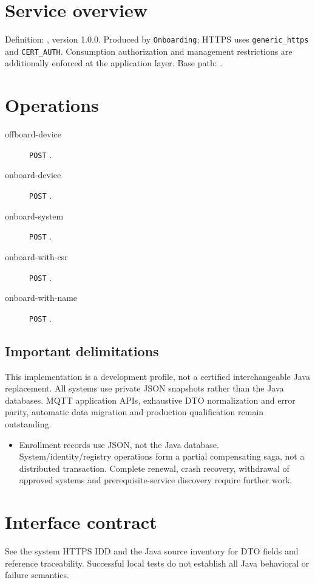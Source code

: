 \documentclass[a4paper]{arrowhead}
\begin{document}
\ArrowheadSetup
\section{Service overview}
Definition: , version 1.0.0. Produced by \texttt{Onboarding}; HTTPS uses \texttt{generic\_https} and \texttt{CERT\_AUTH}. Consumption authorization and management restrictions are additionally enforced at the application layer. Base path: .
\section{Operations}
\begin{description}
\item[offboard-device] \texttt{POST} .
\item[onboard-device] \texttt{POST} .
\item[onboard-system] \texttt{POST} .
\item[onboard-with-csr] \texttt{POST} .
\item[onboard-with-name] \texttt{POST} .
\end{description}
\subsection{Important delimitations}
This implementation is a development profile, not a certified interchangeable Java replacement. All systems use private JSON snapshots rather than the Java databases. MQTT application APIs, exhaustive DTO normalization and error parity, automatic data migration and production qualification remain outstanding.
\begin{itemize}
\item Enrollment records use JSON, not the Java database. System/identity/registry operations form a partial compensating saga, not a distributed transaction. Complete renewal, crash recovery, withdrawal of approved systems and prerequisite-service discovery require further work.
\end{itemize}
\section{Interface contract}
See the system HTTPS IDD and the Java source inventory for DTO fields and reference traceability. Successful local tests do not establish all Java behavioral or failure semantics.
\end{document}
